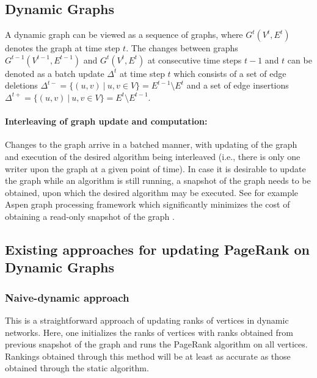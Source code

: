 \subsection{Dynamic Graphs}
\label{sec:about-dynamic}

A dynamic graph can be viewed as a sequence of graphs, where $G^t(V^t, E^t)$ denotes the graph at time step $t$. The changes between graphs $G^{t-1}(V^{t-1}, E^{t-1})$ and $G^t(V^t, E^t)$ at consecutive time steps $t-1$ and $t$ can be denoted as a batch update $\Delta^t$ at time step $t$ which consists of a set of edge deletions $\Delta^{t-} = \{(u, v)\ |\ u, v \in V\} = E^{t-1} \setminus E^t$ and a set of edge insertions $\Delta^{t+} = \{(u, v)\ |\ u, v \in V\} = E^t \setminus E^{t-1}$.

\paragraph{Interleaving of graph update and computation:}

Changes to the graph arrive in a batched manner, with updating of the graph and execution of the desired algorithm being interleaved (i.e., there is only one writer upon the graph at a given point of time). In case it is desirable to update the graph while an algorithm is still running, a snapshot of the graph needs to be obtained, upon which the desired algorithm may be executed. See for example Aspen graph processing framework which significantly minimizes the cost of obtaining a read-only snapshot of the graph \cite{graph-dhulipala19}.




\subsection{Existing approaches for updating PageRank on Dynamic Graphs}

\subsubsection{Naive-dynamic approach}
\label{sec:about-naive}

This is a straightforward approach of updating ranks of vertices in dynamic networks. Here, one initializes the ranks of vertices with ranks obtained from previous snapshot of the graph and runs the PageRank algorithm on all vertices. Rankings obtained through this method will be at least as accurate as those obtained through the static algorithm.


